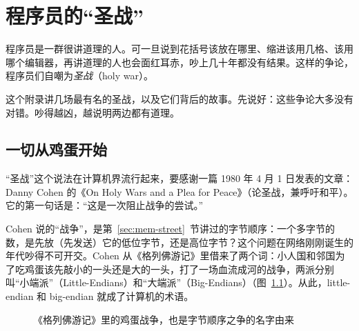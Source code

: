 \chapter{程序员的“圣战”}
\label{app:holy-wars}

程序员是一群很讲道理的人。可一旦说到花括号该放在哪里、缩进该用几格、该用哪个编辑器，再讲道理的人也会面红耳赤，吵上几十年都没有结果。这样的争论，程序员们自嘲为\emph{圣战}（holy war）。

这个附录讲几场最有名的圣战，以及它们背后的故事。先说好：这些争论大多没有对错。吵得越凶，越说明两边都有道理。

\section{一切从鸡蛋开始}

“圣战”这个说法在计算机界流行起来，要感谢一篇 1980 年 4 月 1 日发表的文章：Danny Cohen 的《On Holy Wars and a Plea for Peace》（论圣战，兼呼吁和平）。它的第一句话是：“这是一次阻止战争的尝试。”

Cohen 说的“战争”，是第~\ref{sec:mem-street}~节讲过的字节顺序：一个多字节的数，是先放（先发送）它的低位字节，还是高位字节？这个问题在网络刚刚诞生的年代吵得不可开交。Cohen 从《格列佛游记》里借来了两个词：小人国和邻国为了吃鸡蛋该先敲小的一头还是大的一头，打了一场血流成河的战争，两派分别叫“小端派”（Little-Endians）和“大端派”（Big-Endians）（图~\ref{fig:eggs}）。从此，little-endian 和 big-endian 就成了计算机的术语。

\begin{figure}[htbp]
  \centering
  \caption{《格列佛游记》里的鸡蛋战争，也是字节顺序之争的名字由来}
  \label{fig:eggs}
\end{figure}

